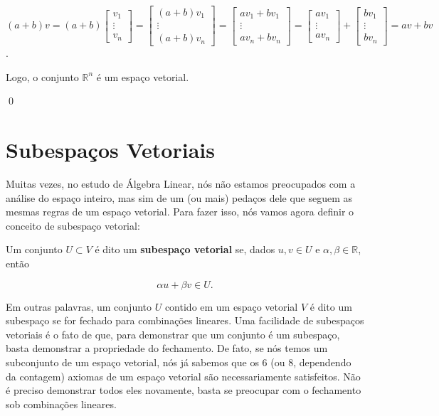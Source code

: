 \begin{Proof}
	$$
	(a + b)v = (a + b)\begin{bmatrix}
		v_1 \\
		\vdots \\
		v_n
	\end{bmatrix} = \begin{bmatrix}
		(a + b)v_1 \\
		\vdots \\
		(a + b)v_n
	\end{bmatrix} = \begin{bmatrix}
		av_1 + bv_1 \\
		\vdots \\
		av_n + bv_n
	\end{bmatrix} = \begin{bmatrix}
		av_1 \\
		\vdots \\
		av_n
	\end{bmatrix} + \begin{bmatrix}
		bv_1 \\
		\vdots \\
		bv_n
	\end{bmatrix} = av + bv
	$$.
	
	Logo, o conjunto $\mathbb{R}^n$ é um espaço vetorial.
	
	\qed
\end{Proof}

\section{Subespaços Vetoriais}

Muitas vezes, no estudo de Álgebra Linear, nós não estamos preocupados com a análise do espaço inteiro, mas sim de um (ou mais) pedaços dele que seguem as mesmas regras de um espaço vetorial. Para fazer isso, nós vamos agora definir o conceito de subespaço vetorial:

\begin{Definition}
	Um conjunto $U\subset V$ é dito um \textbf{subespaço vetorial} se, dados $u, v\in U$ e $\alpha, \beta\in\mathbb{R}$, então
	
	$$
	\alpha u + \beta v \in U.
	$$
\end{Definition}

Em outras palavras, um conjunto $U$ contido em um espaço vetorial $V$ é dito um subespaço se for fechado para combinações lineares. Uma facilidade de subespaços vetoriais é o fato de que, para demonstrar que um conjunto é um subespaço, basta demonstrar a propriedade do fechamento. De fato, se nós temos um subconjunto de um espaço vetorial, nós já sabemos que os 6 (ou 8, dependendo da contagem) axiomas de um espaço vetorial são necessariamente satisfeitos. Não é preciso demonstrar todos eles novamente, basta se preocupar com o fechamento sob combinações lineares.

